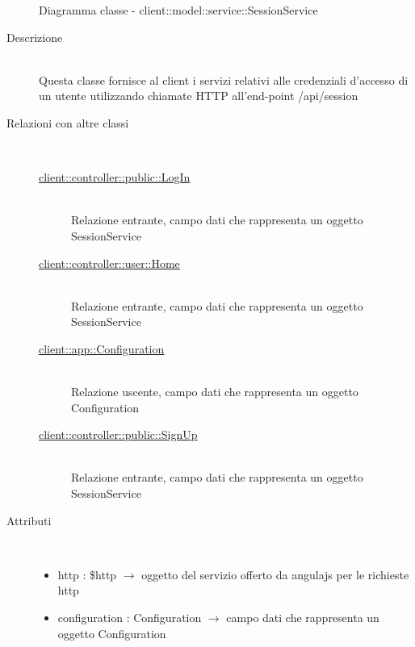 \begin{figure}[H]
	\centering
	\caption{Diagramma classe - client::model::service::SessionService}
\end{figure}\begin{description}
\item[Descrizione] \hfill \\
Questa classe fornisce al client i servizi relativi  alle credenziali d'accesso di un utente utilizzando chiamate HTTP all'end-point /api/session
\item[Relazioni con altre classi] \hfill \\
\vspace{-7mm}
\begin{description}
	\item[\hyperlink{client::controller::public::LogIn}{client::controller::public::LogIn}] \hfill \\
	Relazione entrante, campo dati che rappresenta un oggetto SessionService
	\item[\hyperlink{client::controller::user::Home}{client::controller::user::Home}] \hfill \\
	Relazione entrante, campo dati che rappresenta un oggetto SessionService
	\item[\hyperlink{client::app::Configuration}{client::app::Configuration}] \hfill \\
	Relazione uscente, campo dati che rappresenta un oggetto Configuration
	\item[\hyperlink{client::controller::public::SignUp}{client::controller::public::SignUp}] \hfill \\
	Relazione entrante, campo dati che rappresenta un oggetto SessionService
\end{description}

\item[Attributi] \hfill \\
\vspace{-7mm}
\begin{itemize}
	\item http : \$http $\rightarrow$ oggetto del servizio offerto da angulajs per le richieste http
	\item configuration : Configuration $\rightarrow$ campo dati che rappresenta un oggetto Configuration
\end{itemize}


\end{description}
